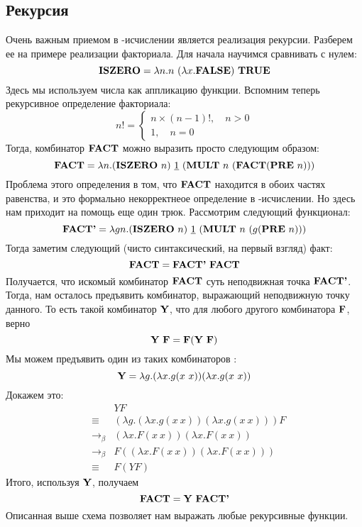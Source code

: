\subsection{Рекурсия}
Очень важным приемом в \textlambda-исчислении является реализация рекурсии. Разберем ее на примере реализации факториала.
Для начала научимся сравнивать с нулем:
$$
  \combinator{iszero} = \lambda n . n\ (\lambda x . \combinator{false})\ \combinator{true}
$$
Здесь мы используем числа как аппликацию функции. Вспомним теперь рекурсивное определение факториала:
$$
  n! =
  \begin{cases}
    n \times (n-1)!,\quad n > 0 \\
    1,\quad n = 0
  \end{cases}
$$
Тогда, комбинатор $\combinator{fact}$ можно выразить просто следующим образом:
$$\combinator{fact} = \lambda n . (\combinator{iszero}\ n)\ \numeral{1}\ (\combinator{mult}\ n\ (\combinator{fact}(\combinator{pre}\ n)))$$
Проблема этого определения в том, что $\combinator{fact}$ находится в обоих частях равенства,
и это формально некорректнеое определение в \textlambda-исчислении. Но здесь нам приходит на помощь еще один трюк. Рассмотрим следующий функционал:
$$\combinator{fact'} = \lambda g n . (\combinator{iszero}\ n)\ \numeral{1}\ (\combinator{mult}\ n\ (g(\combinator{pre}\ n))) $$
Тогда заметим следующий (чисто синтаксический, на первый взгляд) факт:
$$ \combinator{fact} = \combinator{fact'}\ \combinator{fact} $$
Получается, что искомый комбинатор $\combinator{fact}$ суть неподвижная точка $\combinator{fact'}$. Тогда, нам осталось предъявить комбинатор, выражающий
неподвижную точку данного. То есть такой комбинатор $\combinator{Y}$, что для любого другого комбинатора $\combinator{F}$, верно
$$\combinator{Y}\ \combinator{F} = \combinator{F}(\combinator{Y}\ \combinator{F})$$
Мы можем предъявить один из таких комбинаторов \cite{engeler_1984}:
$$ \combinator{Y} = \lambda g . (\lambda x . g (x\ x))(\lambda x . g (x\ x))$$
Докажем это:
\begin{eqnarray*}
  && Y F \\
  & \equiv & (\lambda g . (\lambda x . g (x\ x))(\lambda x . g (x\ x))) F \\
  & \to_\beta & (\lambda x . F (x\ x))(\lambda x . F (x\ x)) \\
  & \to_\beta & F ((\lambda x . F (x\ x))(\lambda x . F (x\ x))) \\
  & \equiv & F (Y F)
\end{eqnarray*}
Итого, используя $\combinator{Y}$, получаем
$$ \combinator{fact} = \combinator{Y}\ \combinator{fact'}$$
Описанная выше схема позволяет нам выражать любые рекурсивные функции.

